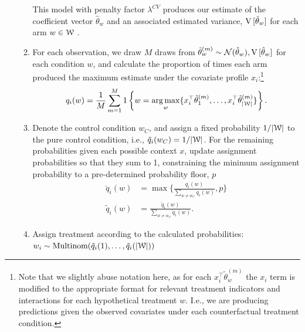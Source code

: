 \documentclass[letterpaper, 12pt, parskip=full,]{scrartcl}
\begin{document}
\begin{enumerate}
\begin{enumerate}
  
 This model with penalty factor $\lambda^{CV}$ produces our estimate of the coefficient vector $\hat \theta_w$ and an associated estimated variance, ${\textrm V}\,[\hat\theta_{w}] $ for each arm $w\in {\EuScript W}$ . 

 \item For each observation, we draw $M$ draws from $\tilde \theta ^{(m)}_w \sim \mathcal{N}(\hat \theta_w),{\textrm V}\,[\hat\theta_{w}]$ for each condition $w$, and calculate the proportion of times each arm produced the maximum estimate under the covariate profile $x_i$:\footnote{Note that we slightly abuse notation here, as for each $ x_i^\top \tilde \theta ^{(m)}_w$ the $x_i$ term is modified to the appropriate format for relevant treatment indicators and interactions for each hypothetical treatment $w$. I.e., we are producing predictions given the observed covariates under each counterfactual treatment condition. }
				\begin{align}
    q_i(w) = \frac{1}{M} \sum_{m=1}^M 1\left\{ w = \operatorname*{arg\,max}_w \{ x_i^\top \tilde \theta ^{(m)}_1, \dots, x_i^\top\tilde \theta_{|{\EuScript W}|}^{(m)} \}  \right\}.
				\end{align}
\item Denote the control condition $w_{C}$, and assign a fixed probability $1/|{\EuScript W}|$ to the pure control condition, i.e., $\tilde{q}_{i}(w_{C}) = 1/|{\EuScript W}|$. For the remaining probabilities given each possible context $x$, update assignment probabilities so that they sum to 1, constraining the minimum assignment probability to a pre-determined probability floor, $p$
      \begin{align}
          \breve{q}_{i}(w) & =\max\Biggr\{\frac{ q_{i}(w)}{\sum\limits_{w \neq w_{C}}q_{i}(w) } , p\Biggr\} \\
          \tilde{q}_{i}(w) & = \frac{ \breve q_{i}(w)}{\sum\limits_{w \neq w_{C}}\breve q_{i}(w) }. 
      \end{align}
\item Assign treatment  according to the calculated probabilities: $w_i \sim \textrm{Multinom}(\tilde{q}_{i}(1), \dots, \tilde{q}_{i}(|{\EuScript W}|))$
\end{enumerate}


\end{enumerate}
\end{document}
